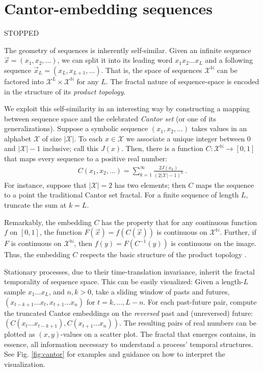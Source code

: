 \documentclass[draft,aps,pre,twocolumn,groupaddress,showkeys,nofootinbib,preprintnumbers,floatfix]{revtex4-2}
\begin{document}
\section{Cantor-embedding sequences}

STOPPED

The geometry of sequences is inherently self-similar. Given an infinite sequence
$\overrightarrow{x} = (x_1,x_2,\dots)$, we can split it into its leading word
$x_1 x_2 \dots x_L$ and a following sequence $\overrightarrow{x}_L =
(x_L,x_{L+1},\dots)$. That is, the space of sequences $\mathcal{X}^\mathbb{N}$
can be factored into $\mathcal{X}^L\times \mathcal{X}^\mathbb{N}$ for any $L$.
The fractal nature of sequence-space is encoded in the structure of its
\emph{product topology}.

We exploit this self-similarity in an interesting way by constructing a mapping
between sequence space and the celebrated \emph{Cantor set} (or one of its
generalizations). Suppose a symbolic sequence $(x_1,x_2,\dots)$ takes values in
an alphabet $\mathcal{X}$ of size $|\mathcal{X}|$. To each $x\in\mathcal{X}$ we
associate a unique integer between $0$ and $|\mathcal{X}|-1$ inclusive; call
this $J(x)$. Then, there is a function $C:\mathcal{X}^\mathbb{N}\rightarrow
[0,1]$ that maps every sequence to a positive real number:
\begin{align*}
  C(x_1,x_2,\dots) = \sum_{k=1}^\infty \frac{2J(x_k)}{(2|\mathcal{X}|-1)^k}
  ~.
\end{align*}
For instance, suppose that $|\mathcal{X}|=2$ has two elements; then $C$ maps the
sequence to a point the traditional Cantor set fractal. For a finite sequence of
length $L$, truncate the sum at $k=L$.

Remarkably, the embedding $C$ has the property that for any continuous function
$f$ on $[0,1]$, the function $F(\overrightarrow{x}) = f(C(\overrightarrow{x}))$
is continuous on $\mathcal{X}^\mathbb{N}$. Further, if $F$ is continuous on
$\mathcal{X}^\mathbb{N}$, then $f(y) = F(C^{-1}(y))$ is continuous on the image.
Thus, the embedding $C$ respects the basic structure of the product topology
\cite{Kurk03a}.

Stationary processes, due to their time-translation invariance, inherit the
fractal temporality of sequence space. This can be easily visualized: Given a
length-$L$ sample $x_1\dots x_L$, and $n,k>0$, take a sliding window of pasts
and futures, $(x_{t-k+1}\dots x_t, x_{t+1}\dots x_n)$ for $t=k,\dots,L-n$.  For
each past-future pair, compute the truncated Cantor embeddings on the
\emph{reversed} past and (unreversed) future: $\left(C(x_t \dots
x_{t-k+1}),C(x_{t+1}\dots x_n)\right)$. The resulting pairs of real numbers can
be plotted as $(x,y)$-values on a scatter plot. The fractal that emerges
contains, in essence, all information necessary to understand a process'
temporal structures. See Fig. \ref{fig:cantor} for examples and guidance on how
to interpret the visualization.
\end{document}
